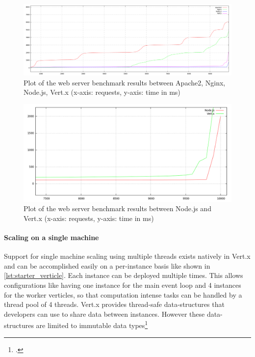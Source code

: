 \begin{figure}[htbp]
\centering
\includegraphics[width=\textwidth]{img/200kb_benchmark.png}
\caption[Plot of the web server benchmark results (all servers)]{Plot of the web server benchmark results between Apache2, Nginx, Node.js, Vert.x (x-axis: requests, y-axis: time in ms)}
\label{fig:benchmark_all}
\end{figure}

\begin{figure}[htbp]
\centering
\includegraphics[width=\textwidth]{img/200kb_benchmark_node_vertx.png}
\caption[Plot of the web server benchmark results (asynchronous servers)]{Plot of the web server benchmark results between Node.js and Vert.x (x-axis: requests, y-axis: time in ms)}
\label{fig:benchmark_async}
\end{figure}


\paragraph{Scaling on a single machine}
Support for single machine scaling using multiple threads exists natively in
Vert.x and can be accomplished easily on a per-instance basis like shown in \autoref{lst:starter_verticle}.
Each instance can
be deployed multiple times. This allows configurations like having one instance
for the main event loop and 4 instances for the worker verticles, so that
computation intense tasks can be handled by a thread pool of 4 threads. 
Vert.x provides  thread-safe data-structures that developers can use to share data between instances. However these data-structures are limited to immutable data types\footcite[Cf.][]{vertx_2012}\\

